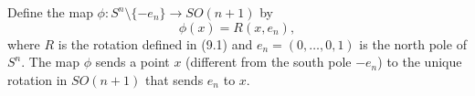 Define the map $\phi: S^n \setminus \{-e_n\} \to SO(n+1)$ by
$$\phi(x) = R(x, e_n),$$
where $R$ is the rotation defined in (9.1) and $e_n = (0, \ldots, 0, 1)$ is the north pole of $S^n$. The map $\phi$ sends a point $x$ (different from the south pole $-e_n$) to the unique rotation in $SO(n+1)$ that sends $e_n$ to $x$.
